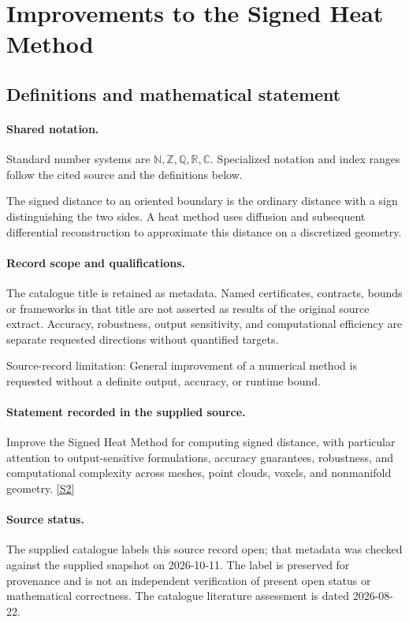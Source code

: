 \documentclass[11pt]{article}
\newcommand{\sref}[2]{\hyperlink{source:#1:#2}{[S#2]}}
\begin{document}
\section{Improvements to the Signed Heat Method}\label{statement}

\subsection{Definitions and mathematical statement}

\paragraph{Shared notation.}Standard number systems are $\mathbb N,\mathbb Z,\mathbb Q,\mathbb R,\mathbb C$. Specialized notation and index ranges follow the cited source and the definitions below.


The signed distance to an oriented boundary is the ordinary distance with a sign distinguishing the two sides. A heat method uses diffusion and subsequent differential reconstruction to approximate this distance on a discretized geometry.
\paragraph{Record scope and qualifications.}
The catalogue title is retained as metadata. Named certificates, contracts, bounds or frameworks in that title are not asserted as results of the original source extract.
Accuracy, robustness, output sensitivity, and computational efficiency are separate requested directions without quantified targets.

Source-record limitation: General improvement of a numerical method is requested without a definite output, accuracy, or runtime bound.
\paragraph{Statement recorded in the supplied source.}
Improve the Signed Heat Method for computing signed distance, with particular attention to output-sensitive formulations, accuracy guarantees, robustness, and computational complexity across meshes, point clouds, voxels, and nonmanifold geometry. \sref{statement}{2}
\paragraph{Source status.}
The supplied catalogue labels this source record open; that metadata was checked against the supplied snapshot on 2026-10-11. The label is preserved for provenance and is not an independent verification of present open status or mathematical correctness. The catalogue literature assessment is dated 2026-08-22.
\end{document}
